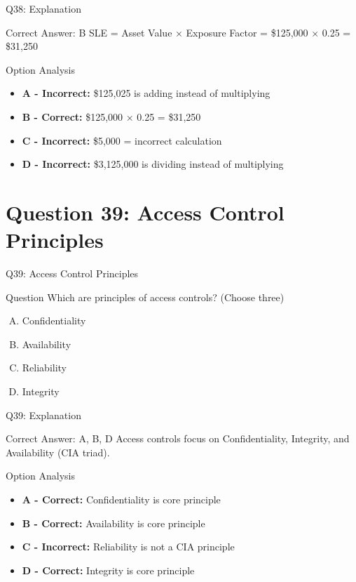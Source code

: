\documentclass{beamer}
\begin{document}
	\begin{frame}{Q38: Explanation}
		\begin{block}{Correct Answer: B}
			SLE = Asset Value × Exposure Factor = \$125,000 × 0.25 = \$31,250
		\end{block}
		\begin{block}{Option Analysis}
			\begin{itemize}
				\item \textbf{A - Incorrect:} \$125,025 is adding instead of multiplying
				\item \textbf{B - Correct:} \$125,000 × 0.25 = \$31,250
				\item \textbf{C - Incorrect:} \$5,000 = incorrect calculation
				\item \textbf{D - Incorrect:} \$3,125,000 is dividing instead of multiplying
			\end{itemize}
		\end{block}
	\end{frame}
	
	\section{Question 39: Access Control Principles}
	
	\begin{frame}{Q39: Access Control Principles}
		\begin{block}{Question}
			Which are principles of access controls? (Choose three)
		\end{block}
		\begin{enumerate}[(A)]
			\item Confidentiality
			\item Availability
			\item Reliability
			\item Integrity
		\end{enumerate}
	\end{frame}
	
	\begin{frame}{Q39: Explanation}
		\begin{block}{Correct Answer: A, B, D}
			Access controls focus on Confidentiality, Integrity, and Availability (CIA triad).
		\end{block}
		\begin{block}{Option Analysis}
			\begin{itemize}
				\item \textbf{A - Correct:} Confidentiality is core principle
				\item \textbf{B - Correct:} Availability is core principle
				\item \textbf{C - Incorrect:} Reliability is not a CIA principle
				\item \textbf{D - Correct:} Integrity is core principle
			\end{itemize}
		\end{block}
	\end{frame}
	
\end{document}
